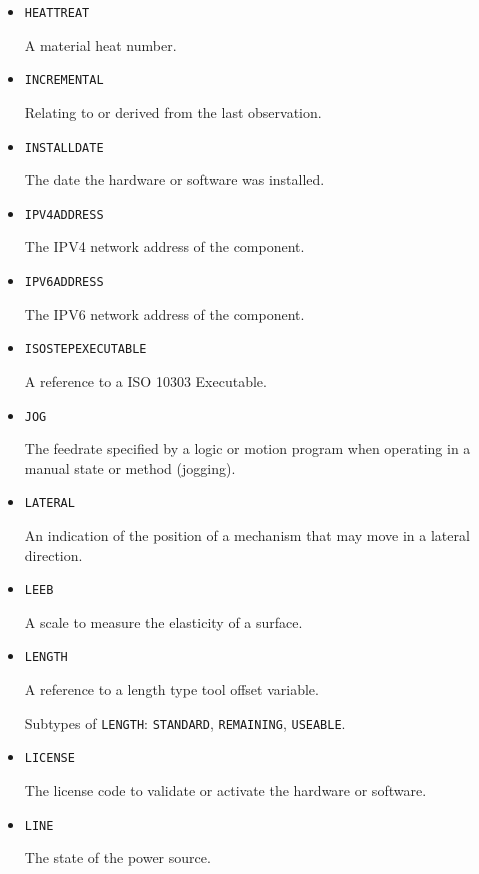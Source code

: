 \begin{itemize}
\item \texttt{HEAT\textunderscore TREAT}  

A material heat number.


\item \texttt{INCREMENTAL}  

Relating to or derived from the last \gls{observation}.


\item \texttt{INSTALL\textunderscore DATE}  

The date the hardware or software was installed.


\item \texttt{IPV4\textunderscore ADDRESS}  

The IPV4 network address of the component.


\item \texttt{IPV6\textunderscore ADDRESS}  

The IPV6 network address of the component.


\item \texttt{ISO\textunderscore STEP\textunderscore EXECUTABLE}  

A reference to a ISO 10303 Executable.


\item \texttt{JOG}  

The feedrate specified by a logic or motion program when operating in a manual state or method (jogging).


\item \texttt{LATERAL}  

An indication of the position of a mechanism that may move in a lateral direction.


\item \texttt{LEEB}  

A scale to measure the elasticity of a surface.


\item \texttt{LENGTH}  

A reference to a length type tool offset variable.

Subtypes of \texttt{LENGTH}: \texttt{STANDARD}, \texttt{REMAINING}, \texttt{USEABLE}.

\item \texttt{LICENSE}  

The license code to validate or activate the hardware or software.


\item \texttt{LINE}  

The state of the power source.


\end{itemize}

